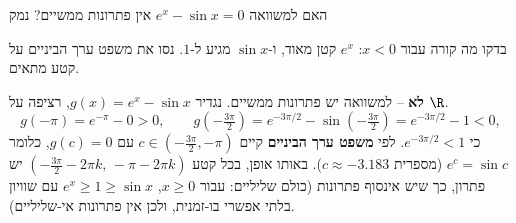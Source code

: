 
\begin{question}
האם למשוואה $e^x-\sin x=0$ אין פתרונות ממשיים? נמק
\end{question}

\begin{hint}
בדקו מה קורה עבור $x<0$: $e^x$ קטן מאוד, ו-$\sin x$ מגיע ל-$1$. נסו את משפט ערך הביניים על קטע מתאים.
\end{hint}

\begin{solution}
\textbf{לא} – למשוואה יש פתרונות ממשיים. נגדיר $g(x)=e^x-\sin x$, רציפה על $\R$.
\[ g(-\pi)=e^{-\pi}-0>0,\qquad g\left(-\tfrac{3\pi}{2}\right)=e^{-3\pi/2}-\sin\left(-\tfrac{3\pi}{2}\right)=e^{-3\pi/2}-1<0, \]
כי $e^{-3\pi/2}<1$. לפי \textbf{משפט ערך הביניים} קיים $c\in\left(-\frac{3\pi}2,-\pi\right)$ עם $g(c)=0$, כלומר $e^c=\sin c$ (מספרית $c\approx-3.183$). באותו אופן, בכל קטע $\left(-\frac{3\pi}{2}-2\pi k,\,-\pi-2\pi k\right)$ יש פתרון, כך שיש אינסוף פתרונות (כולם שליליים: עבור $x\ge0$, $e^x\ge1\ge\sin x$ עם שוויון בלתי אפשרי בו-זמנית, ולכן אין פתרונות אי-שליליים).
\end{solution}
